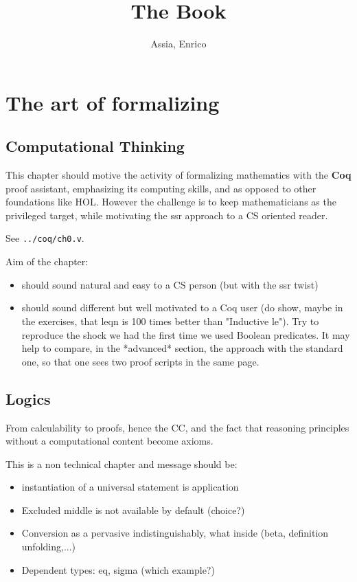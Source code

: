 \documentclass{book}
\title{The Book}
\author{Assia, Enrico}
\begin{document}
\maketitle
\tableofcontents{}

\part{The art of formalizing}

\chapter{Computational Thinking}\label{ch:compthink}

This chapter should motive the activity of formalizing mathematics
with the {\bf Coq} proof assistant, emphasizing its computing skills,
and as opposed to other foundations like HOL. However the challenge is
to keep mathematicians as the privileged target, while motivating the
ssr approach to a CS oriented reader.

See \verb+../coq/ch0.v+.

Aim of the chapter:
\begin{itemize}
\item should sound natural and easy to a CS person (but with the ssr twist)
\item should sound different but well motivated to a Coq user (do show, maybe in
  the exercises, that leqn is 100 times better than "Inductive le").  Try to
  reproduce the shock we had the first time we used Boolean predicates.  It may
  help to compare, in the *advanced* section, the approach with the standard
  one, so that one sees two proof scripts in the same page.
\end{itemize}

\chapter{Logics}

From calculability to proofs, hence the CC, and the fact that
reasoning principles without a computational content become axioms.

This is a non technical chapter and message should be:
\begin{itemize}
\item instantiation of a universal statement is application
\item Excluded middle is not available by default (choice?)
\item Conversion as a pervasive indistinguishably, what inside
  (beta, definition unfolding,...)
\item Dependent types: eq, sigma (which example?)
\end{itemize}
\end{document}
